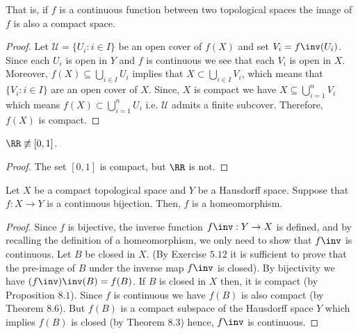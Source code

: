 \documentclass[12pt, a4paper]{article}
\begin{document}
\begin{mdnote}
    That is, if \(f\) is a continuous function between two topological spaces the image of \(f\) is also a compact space.
\end{mdnote}

\begin{proof}
    Let \(\mathcal{U}=\{U_i : i \in I\}\) be an open cover of \(f(X)\) and set \(V_i=f\inv(U_i)\). Since each \(U_i\) is open in \(Y\) and \(f\) is continuous we see that each \(V_i\) is open in \(X\). Moreover, \(f(X) \subseteq \bigcup_{i \in I} U_i\) implies that \(X \subset \bigcup_{i \in I} V_i\), which means that \(\{V_i: i\in I\}\) are an open cover of \(X\). Since, \(X\) is compact we have \(X \subseteq \bigcup_{i=1}^n V_i\) which means \(f(X) \subset \bigcup_{i=1}^n U_i\) i.e. \(\mathcal{U}\) admits a finite subcover. Therefore, \(f(X)\) is compact.
\end{proof}

\begin{corollary}
    \(\RR \not\equiv [0,1]\).
\end{corollary}

\begin{proof}
    The set \([0,1]\) is compact, but \(\RR\) is not.
\end{proof}

\begin{mdthm}
    Let \(X\) be a compact topological space and \(Y\) be a Hausdorff space. Suppose that \(f:X\to Y\) is a continuous bijection. Then, \(f\) is a homeomorphism.
\end{mdthm}

\begin{proof}
    Since \(f\) is bijective, the inverse function \(f\inv : Y \to X\) is defined, and by recalling the definition of a homeomorphism, we only need to show that \(f\inv\) is continuous. Let \(B\) be closed in \(X\). (By Exercise \(5.12\) it is sufficient to prove that the pre-image of \(B\) under the inverse map \(f\inv\) is closed). By bijectivity we have \((f\inv)\inv(B)=f(B)\). If \(B\) is closed in \(X\) then, it is compact (by Proposition \(8.1\)). Since \(f\) is continuous we have \(f(B)\) is also compact (by Theorem \(8.6\)). But \(f(B)\) is a compact subspace of the Hausdorff space \(Y\) which implies \(f(B)\) is closed (by Theorem \(8.3\)) hence, \(f\inv\) is continuous.
\end{proof}
\end{document}
